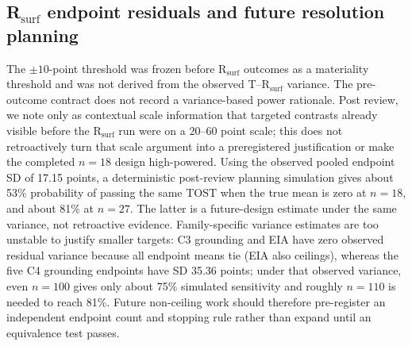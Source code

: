 \subsection{R$_{\mathrm{surf}}$ endpoint residuals and future resolution planning}\label{sec:future-power}
The $\pm10$-point threshold was frozen before R$_{\mathrm{surf}}$ outcomes as a materiality threshold and was not derived from the observed T--R$_{\mathrm{surf}}$ variance. The pre-outcome contract does not record a variance-based power rationale. Post review, we note only as contextual scale information that targeted contrasts already visible before the R$_{\mathrm{surf}}$ run were on a 20--60 point scale; this does not retroactively turn that scale argument into a preregistered justification or make the completed $n=18$ design high-powered. Using the observed pooled endpoint SD of 17.15 points, a deterministic post-review planning simulation gives about 53\% probability of passing the same TOST when the true mean is zero at $n=18$, and about 81\% at $n=27$. The latter is a future-design estimate under the same variance, not retroactive evidence. Family-specific variance estimates are too unstable to justify smaller targets: C3 grounding and EIA have zero observed residual variance because all endpoint means tie (EIA also ceilings), whereas the five C4 grounding endpoints have SD 35.36 points; under that observed variance, even $n=100$ gives only about 75\% simulated sensitivity and roughly $n=110$ is needed to reach 81\%. Future non-ceiling work should therefore pre-register an independent endpoint count and stopping rule rather than expand until an equivalence test passes.

